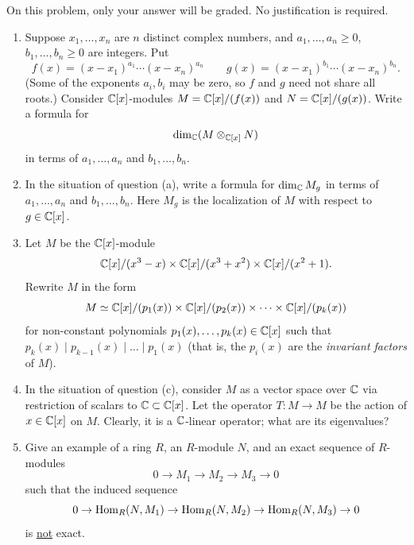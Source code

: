 \begin{question}[subtitle = August 2025 Problem 1,ID=Aug25_1]
On this problem, only your answer will be graded. No justification is required.
\begin{enumerate}
    \item Suppose $x_1,\dots,x_n$ are $n$ distinct complex numbers, and $a_1,\dots,a_n \geq 0$, $b_1,\dots,b_n \geq 0$ are integers. Put
    \[f(x) = (x-x_1)^{a_1} \cdots (x-x_n)^{a_n} \qquad g(x) = (x-x_1)^{b_1} \cdots (x - x_n)^{b_n}.\]
    (Some of the exponents $a_i, b_i$ may be zero, so $f$ and $g$ need not share all roots.)
    Consider $\mathbb{C}[x]$-modules $M = \mathbb{C}[x]/(f(x))$ and $N = \mathbb{C}[x]/(g(x))$. Write a formula for
    \[\dim_{\mathbb{C}} (M \otimes_{\mathbb{C}[x]} N)\]
    in terms of $a_1,\dots,a_n$ and $b_1, \dots, b_n$.
    \item In the situation of question (a), write a formula for $\dim_{\mathbb{C}} M_g$ in terms of $a_1,\dots,a_n$ and $b_1,\dots,b_n$. Here $M_g$ is the localization of $M$ with respect to $g \in \mathbb{C}[x]$.
    \item Let $M$ be the $\mathbb{C}[x]$-module
    \[\mathbb{C}[x]/(x^3-x) \times \mathbb{C}[x]/(x^3+x^2) \times \mathbb{C}[x]/(x^2+1).\]
    Rewrite $M$ in the form
    \[M \simeq \mathbb{C}[x]/(p_1(x)) \times \mathbb{C}[x]/(p_2(x)) \times \cdots \times \mathbb{C}[x]/(p_k(x))\]
    for non-constant polynomials $p_1(x),\dots,p_k(x) \in \mathbb{C}[x]$ such that $p_k(x) \mid p_{k-1}(x) \mid \dots \mid p_1(x)$ (that is, the $p_i(x)$ are the \emph{invariant factors} of $M$).
    \item In the situation of question (c), consider $M$ as a vector space over $\mathbb{C}$ via restriction of scalars to $\mathbb{C} \subset \mathbb{C}[x]$. Let the operator $T\colon M \to M$ be the action of $x \in \mathbb{C}[x]$ on $M$. Clearly, it is a $\mathbb{C}$-linear operator; what are its eigenvalues?
    \item Give an example of a ring $R$, an $R$-module $N$, and an exact sequence of $R$-modules
    \[0 \to M_1 \to M_2 \to M_3 \to 0\]
    such that the induced sequence
    \[0 \to \operatorname{Hom}_R(N,M_1) \to \operatorname{Hom}_R(N,M_2) \to \operatorname{Hom}_R(N,M_3) \to 0\]
    is \underline{not} exact.
\end{enumerate}
\end{question}

